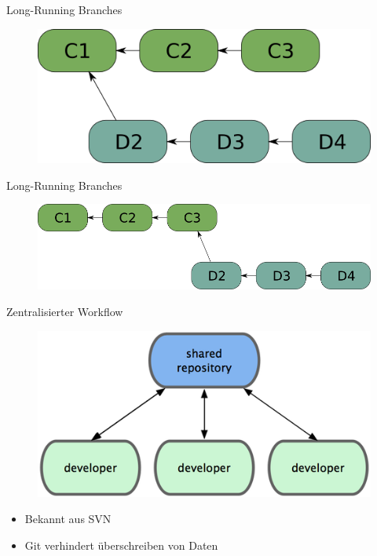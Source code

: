 \documentclass{beamer}
\begin{document}
\begin{frame}{Long-Running Branches}
\begin{figure} 
\centering
  \includegraphics[scale=0.5]{images/long-running-branch2.png}
\end{figure}
\end{frame}

\begin{frame}{Long-Running Branches}
\begin{figure} 
\centering
  \includegraphics[scale=0.5]{images/long-running-branch3.png}
\end{figure}
\end{frame}


\begin{frame}{Zentralisierter Workflow}
\begin{figure} 
\centering
\includegraphics{images/centralized-workflow.png}
\end{figure}
\begin{itemize}
\pause \item Bekannt aus SVN
\pause \item Git verhindert überschreiben von Daten
\end{itemize}
\end{frame}
\end{document}
